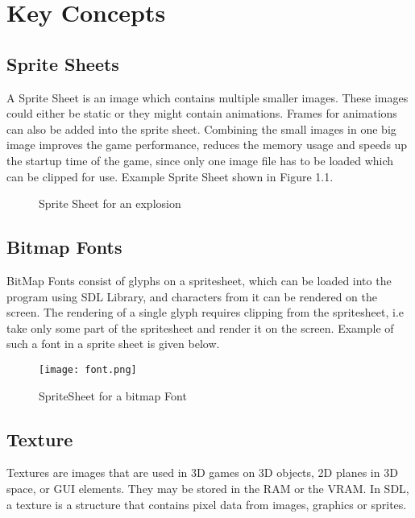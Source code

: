 \documentclass[11pt,fleqn]{book} %
\begin{document}
\section{Key Concepts}

\subsection{Sprite Sheets}
A Sprite Sheet is an image which contains multiple smaller images. These images could either be static or they might contain animations. Frames for animations can also be added into the sprite sheet. Combining the small images in one big image improves the game performance, reduces the memory usage and speeds up the startup time of the game, since only one image file has to be loaded which can be clipped for use. Example Sprite Sheet shown in Figure 1.1.

\begin{figure}[h]
  \centering
  \caption{Sprite Sheet for an explosion}
\end{figure}


\subsection{Bitmap Fonts}

BitMap Fonts consist of glyphs on a spritesheet, which can be loaded into the program using SDL Library, and characters from it can be rendered on the screen. The rendering of a single glyph requires clipping from the spritesheet, i.e take only some part of the spritesheet and render it on the screen. Example of such a font in a sprite sheet is given below.

\begin{figure}[h]
  \centering
  \texttt{[image: font.png]}
  \caption{SpriteSheet for a bitmap Font}
\end{figure}


\subsection{Texture}

Textures are images that are used in 3D games on 3D objects, 2D planes in 3D space, or GUI elements. They may be stored in the RAM or the VRAM. In SDL, a texture is a structure that contains pixel data from images, graphics or sprites. 
\end{document}
